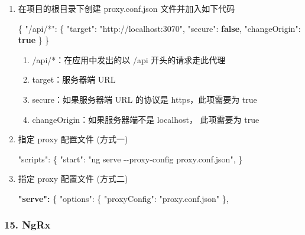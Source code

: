 \documentclass[
]{article}
\newenvironment{Shaded}{}{}
\newcommand{\DataTypeTok}[1]{\textcolor[rgb]{0.56,0.13,0.00}{#1}}
\newcommand{\ErrorTok}[1]{\textcolor[rgb]{1.00,0.00,0.00}{\textbf{#1}}}
\newcommand{\FunctionTok}[1]{\textcolor[rgb]{0.02,0.16,0.49}{#1}}
\newcommand{\KeywordTok}[1]{\textcolor[rgb]{0.00,0.44,0.13}{\textbf{#1}}}
\newcommand{\NormalTok}[1]{#1}
\newcommand{\OperatorTok}[1]{\textcolor[rgb]{0.40,0.40,0.40}{#1}}
\newcommand{\StringTok}[1]{\textcolor[rgb]{0.25,0.44,0.63}{#1}}
\begin{document}
\begin{enumerate}
\def\labelenumi{\arabic{enumi}.}
\item
  在项目的根目录下创建 proxy.conf.json 文件并加入如下代码

\begin{Shaded}
\begin{Highlighting}[]
\FunctionTok{\{}
 	\DataTypeTok{"/api/*"}\FunctionTok{:} \FunctionTok{\{}
    \DataTypeTok{"target"}\FunctionTok{:} \StringTok{"http://localhost:3070"}\FunctionTok{,}
    \DataTypeTok{"secure"}\FunctionTok{:} \KeywordTok{false}\FunctionTok{,}
    \DataTypeTok{"changeOrigin"}\FunctionTok{:} \KeywordTok{true}
  \FunctionTok{\}}
\FunctionTok{\}}
\end{Highlighting}
\end{Shaded}

  \begin{enumerate}
  \def\labelenumii{\arabic{enumii}.}
  \item
    /api/*：在应用中发出的以 /api 开头的请求走此代理
  \item
    target：服务器端 URL
  \item
    secure：如果服务器端 URL 的协议是 https，此项需要为 true
  \item
    changeOrigin：如果服务器端不是 localhost， 此项需要为 true
  \end{enumerate}
\item
  指定 proxy 配置文件 (方式一)

\begin{Shaded}
\begin{Highlighting}[]
\StringTok{"scripts"}\OperatorTok{:}\NormalTok{ \{}
  \StringTok{"start"}\OperatorTok{:} \StringTok{"ng serve {-}{-}proxy{-}config proxy.conf.json"}\OperatorTok{,}
\NormalTok{\}}
\end{Highlighting}
\end{Shaded}
\item
  指定 proxy 配置文件 (方式二)

\begin{Shaded}
\begin{Highlighting}[]
\ErrorTok{"serve":} \FunctionTok{\{}
  \DataTypeTok{"options"}\FunctionTok{:} \FunctionTok{\{}
    \DataTypeTok{"proxyConfig"}\FunctionTok{:} \StringTok{"proxy.conf.json"}
  \FunctionTok{\},}
\end{Highlighting}
\end{Shaded}
\end{enumerate}

\hypertarget{15-ngrx}{%
\subsubsection{15. NgRx}\label{15-ngrx}}
\end{document}
